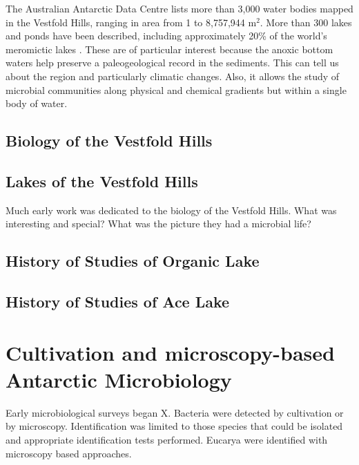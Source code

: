 The Australian Antarctic Data Centre lists more than 3,000 water bodies mapped in the Vestfold Hills, ranging in area from 1 to 8,757,944 m$^2$. %
More than 300 lakes and ponds have been described, including approximately 20\% of the world's meromictic lakes \cite{Gibson, 1999}. %
These are of particular interest because the anoxic bottom waters help preserve a paleogeological record in the sediments.
This can tell us about the region and particularly climatic changes.
Also, it allows the study of microbial communities along physical and chemical gradients but within a single body of water.



\subsection{Biology of the Vestfold Hills}

\subsection{Lakes of the Vestfold Hills}

Much early work was dedicated to the biology of the Vestfold Hills.
What was interesting and special?
What was the picture they had a microbial life?

\subsection{History of Studies of Organic Lake}
\subsection{History of Studies of Ace Lake}


\section{Cultivation and microscopy-based Antarctic Microbiology}

Early microbiological surveys began X.
Bacteria were detected by cultivation or by microscopy. 
Identification was limited to those species that could be isolated and appropriate identification tests performed.
Eucarya were identified with microscopy based approaches.


